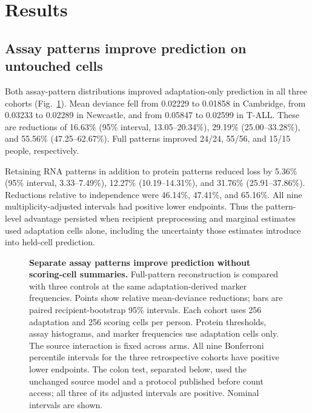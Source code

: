 \documentclass[pdflatex,sn-vancouver-num,iicol]{sn-jnl}
\begin{document}
\section{Results}
\subsection{Assay patterns improve prediction on untouched cells}
Both assay-pattern distributions improved adaptation-only prediction in all
three cohorts (Fig.~\ref{fig:adaptation}). Mean deviance fell from 0.02229 to
0.01858 in Cambridge, from 0.03233 to 0.02289 in Newcastle, and from 0.05847
to 0.02599 in T-ALL. These are reductions of 16.63\% (95\% interval,
13.05--20.34\%), 29.19\% (25.00--33.28\%), and 55.56\%
(47.25--62.67\%). Full patterns improved 24/24, 55/56, and 15/15 people,
respectively.

Retaining RNA patterns in addition to protein patterns reduced loss by
5.36\% (95\% interval, 3.33--7.49\%), 12.27\% (10.19--14.31\%), and
31.76\% (25.91--37.86\%). Reductions relative to independence were
46.14\%, 47.41\%, and 65.16\%. All nine multiplicity-adjusted intervals
had positive lower endpoints. Thus the pattern-level advantage persisted
when recipient preprocessing and marginal estimates used adaptation cells
alone, including the uncertainty those estimates introduce into held-cell
prediction.

\begin{figure}[t]
\centering

\caption{\textbf{Separate assay patterns improve prediction without scoring-cell summaries.}
Full-pattern reconstruction is compared with three controls at the same
adaptation-derived marker frequencies. Points show relative mean-deviance
reductions; bars are paired recipient-bootstrap 95\% intervals. Each cohort
uses 256 adaptation and 256 scoring cells per person. Protein thresholds,
assay histograms, and marker frequencies use adaptation cells only. The
source interaction is fixed across arms. All nine Bonferroni percentile
intervals for the three retrospective cohorts have positive lower endpoints.
The colon test, separated below, used the unchanged source model and a protocol
published before count access; all three of its adjusted intervals are positive.
Nominal intervals are shown.}
\label{fig:adaptation}
\end{figure}
\end{document}
